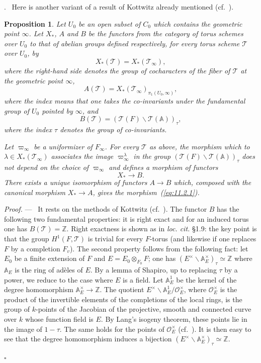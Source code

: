 \documentclass[12pt,a4paper,oneside,english,leqno]{smfart}
\makeatletter
\numberwithin{equation}{subsection}
\newcounter{theo}
\numberwithin{theo}{subsection}
\newenvironment{paragr}[1][]{\medskip\refstepcounter{subsection}%
  \par\noindent\hspace*{\parindent}\thesubsection.\ \emph{#1}%
  \@ifundefined{@empty}{}{}\ignorespaces}{\medskip}
\theoremstyle{plain}
\newtheorem{proposition}[theo]{Proposition}
\theoremstyle{definition}
\theoremstyle{remark}
\newenvironment{preuve}[1][]{\medskip\noindent\textit{Proof.} #1 ---\ }%
  {\hfill\ensuremath{\square}\medskip}
\newcommand{\ZZ}{\mathbb{Z}}
\newcommand{\AAA}{\mathbb{A}}
\newcommand{\oc}{\mathcal{O}}
\newcommand{\tc}{\mathcal{T}}
\newcommand{\back}{\backslash}
\makeatother
\begin{document}
\begin{paragr}\label{S:11.2}
Here is another variant of a result of Kottwitz already mentioned (cf.\ \cite[Lemma 2.2]{Kottwitz-isocrystals}).

\begin{proposition}\label{thm:11.2.1}
Let $U_0$ be an open subset of $C_0$ which contains the geometric point $\infty$. Let $X_*$, $A$ and $B$ be the functors from the category of torus schemes over $U_0$ to that of abelian groups defined respectively, for every torus scheme $\tc$ over $U_0$, by
$$
X_*(\tc)=X_*(\tc_\infty),
$$
where the right-hand side denotes the group of cocharacters of the fiber of $\tc$ at the geometric point $\infty$,
$$
A(\tc)=X_*(\tc_\infty)_{\pi_1(U_0,\infty)},
$$
where the index means that one takes the co-invariants under the fundamental group of $U_0$ pointed by $\infty$, and
$$
B(\tc)=(\tc(F)\back\tc(\AAA))_\tau,
$$
where the index $\tau$ denotes the group of co-invariants.

Let $\varpi_\infty$ be a uniformizer of $F_\infty$. For every $\tc$ as above, the morphism which to $\lambda\in X_*(\tc_\infty)$ associates the image $\varpi_\infty^\lambda$ in the group $(\tc(F)\back\tc(\AAA))_\tau$ does not depend on the choice of $\varpi_\infty$ and defines a morphism of functors
\begin{equation}\label{eq:11.2.1}
X_*\to B.
\end{equation}
There exists a unique isomorphism of functors $A\to B$ which, composed with the canonical morphism $X_*\to A$, gives the morphism~(\ref{eq:11.2.1}).
\end{proposition}

\begin{preuve}
It rests on the methods of Kottwitz (cf.\ \cite[proof of Lemma 2.2]{Kottwitz-isocrystals}). The functor $B$ has the following two fundamental properties: it is right exact and for an induced torus one has $B(\tc)=\ZZ$. Right exactness is shown as in \emph{loc. cit.} \S1.9: the key point is that the group $H^1(F,\tc)$ is trivial for every $F$-torus (and likewise if one replaces $F$ by a completion $F_v$). The second property follows from the following fact: let $E_0$ be a finite extension of $F$ and $E=E_0\otimes_{F_0}F$; one has $(E^\times\back\AAA_E^\times)_\tau\simeq\ZZ$ where $\AAA_E$ is the ring of adèles of $E$. By a lemma of Shapiro, up to replacing $\tau$ by a power, we reduce to the case where $E$ is a field. Let $\AAA_E^1$ be the kernel of the degree homomorphism $\AAA_E^\times\to\ZZ$. The quotient $E^\times\back\AAA_E^1/\oc_E^\times$, where $\oc_E^\times$ is the product of the invertible elements of the completions of the local rings, is the group of $k$-points of the Jacobian of the projective, smooth and connected curve over $k$ whose function field is $E$. By Lang's isogeny theorem, these points lie in the image of $1-\tau$. The same holds for the points of $\oc_E^\times$ (cf.\ \cite[proof of Prop.\ 2.3]{Kottwitz-isocrystals}). It is then easy to see that the degree homomorphism induces a bijection $(E^\times\back\AAA_E^\times)_\tau\simeq\ZZ$.


\end{preuve}
\end{paragr}
\end{document}
